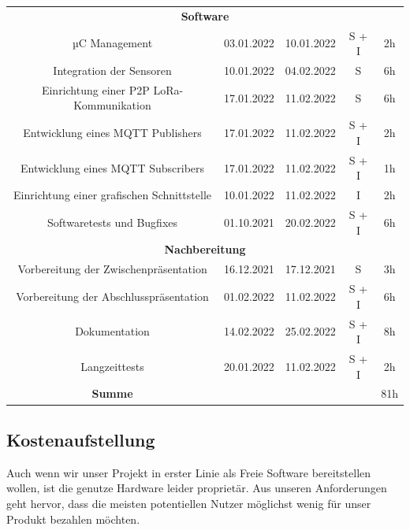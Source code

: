 \begin{adjustwidth}{-1in}{-1in}
\begin{center}
\begin{tabular}{ ccccc }
			\midrule
			\multicolumn{5}{c}{\textbf{Software}} \\
			{µC Management} & {03.01.2022} & {10.01.2022} & S + I & 2h\\
			{Integration der Sensoren} & {10.01.2022} & {04.02.2022} & S & 6h\\
			{Einrichtung einer P2P LoRa-Kommunikation} & {17.01.2022} & {11.02.2022} & S & 6h\\
			{Entwicklung eines MQTT Publishers} & {17.01.2022} & {11.02.2022} & S + I & 2h\\
			{Entwicklung eines MQTT Subscribers} & {17.01.2022} & {11.02.2022} & S + I & 1h\\
			{Einrichtung einer grafischen Schnittstelle} & {10.01.2022} & {11.02.2022} &  I & 2h\\
			{Softwaretests und Bugfixes} & {01.10.2021} & {20.02.2022} & S + I & 6h\\

			\midrule
			\multicolumn{5}{c}{\textbf{Nachbereitung}} \\
			{Vorbereitung der Zwischenpräsentation} & {16.12.2021} & {17.12.2021} & S & 3h\\
			{Vorbereitung der Abschlusspräsentation} & {01.02.2022} & {11.02.2022} & S + I & 6h\\
			{Dokumentation} & {14.02.2022} & {25.02.2022} & S + I & 8h\\
			{Langzeittests} & {20.01.2022} & {11.02.2022} & S + I & 2h\\

			\midrule
			{\textbf{Summe}} & & & & 81h\\

			\bottomrule
		\end{tabular}
		 \label{tab:worklog} 
	\end{center}

\end{adjustwidth}

\newpage

\subsection{Kostenaufstellung} \label{Kostenaufstellung}

Auch wenn wir unser Projekt in erster Linie als Freie Software bereitstellen wollen, ist die genutze Hardware leider proprietär.
Aus unseren Anforderungen geht hervor, dass die meisten potentiellen Nutzer möglichst wenig für unser Produkt bezahlen möchten. 

